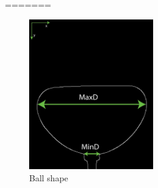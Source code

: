 =======
\begin{figure}[H] %
	\centering%
  \includegraphics[width=0.48\textwidth]{figures/Chapter_1/ball_shape.png}
	\caption{Ball shape}
	\label{fig:ball_shape}
\end{figure}
